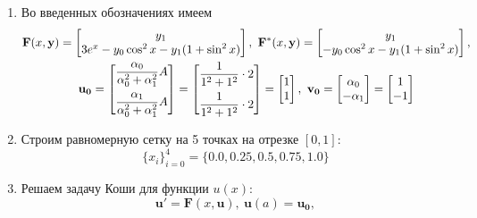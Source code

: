 \documentclass[a4paper, 12pt]{article}
\begin{document}
	\begin{enumerate}
		\item Во введенных обозначениях имеем
		\begin{equation*}
			\begin{gathered}
				\mathbf{F}(x, \mathbf{y})=
				\begin{bmatrix}
					y_1\\
					3e^x-y_0\cos^2x-y_1(1+\sin^2x)
				\end{bmatrix}, \
				\mathbf{F^*}(x, \mathbf{y})=
				\begin{bmatrix}
					y_1\\
					-y_0\cos^2x-y_1(1+\sin^2x)
				\end{bmatrix}, \\
				\mathbf{u_0}=
				\begin{bmatrix}
					\dfrac{\alpha_0}{\alpha_0^2+\alpha_1^2}A \vspace{0.5em}\\ 
					\dfrac{\alpha_1}{\alpha_0^2+\alpha_1^2}A
				\end{bmatrix}=
				\begin{bmatrix}
					\dfrac{1}{1^2+1^2}\cdot2 \vspace{0.5em} \\
					\dfrac{1}{1^2+1^2}\cdot2
				\end{bmatrix}=
				\begin{bmatrix}
					1\\
					1
				\end{bmatrix}, \
				\mathbf{v_0}=
				\begin{bmatrix}
					\alpha_0\\
					-\alpha_1
				\end{bmatrix}=
				\begin{bmatrix}
					1\\
					-1
				\end{bmatrix}
			\end{gathered}
		\end{equation*}
		\item Строим равномерную сетку на 5 точках на отрезке $[0,1]$:
			\begin{equation*}
				\{x_i\}_{i=0}^4=\{0.0, 0.25, 0.5, 0.75, 1.0\}
			\end{equation*}
		\item Решаем задачу Коши для функции $u(x)$:
			\begin{equation*}
				\mathbf{u'}=\mathbf{F}(x,\mathbf{u}), \ \mathbf{u}(a)=\mathbf{u_0},
			\end{equation*}

\end{enumerate}
\end{document}
